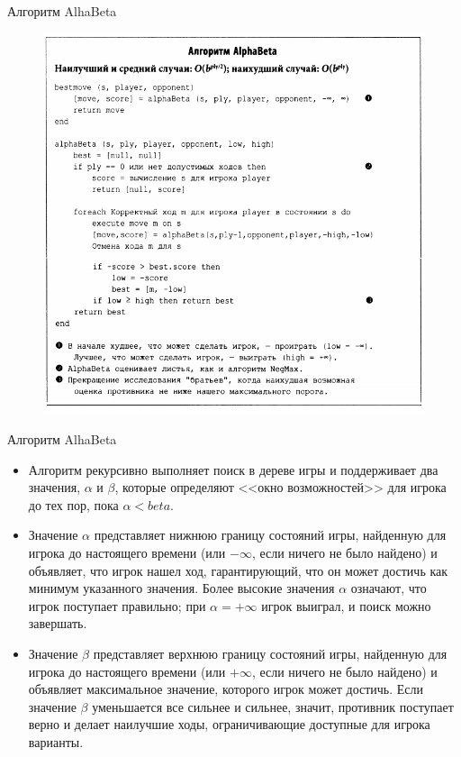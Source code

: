 \documentclass{beamer}
\begin{document}
\begin{frame}{Алгоритм AlhaBeta}
\begin{figure}[h]
\centering
\includegraphics[scale=0.4]{images/lec05-pic10.png}
\end{figure}
\end{frame}

\begin{frame}{Алгоритм AlhaBeta}
\begin{itemize}
\item Алгоритм рекурсивно выполняет поиск в дереве игры и поддерживает
два значения, $\alpha$ и $\beta$, которые определяют <<окно возможностей>> для игрока до тех пор, пока $\alpha < beta$. 
\item Значение $\alpha$ представляет нижнюю границу состояний игры, найденную для игрока до настоящего времени (или $-\infty$, если ничего не было найдено)
и объявляет, что игрок нашел ход, гарантирующий, что он может достичь как минимум указанного значения. Более высокие значения $\alpha$ означают, что игрок поступает правильно; при $\alpha = +\infty$ игрок выиграл, и поиск можно завершать.
\item Значение $\beta$ представляет верхнюю границу состояний игры, найденную для игрока до настоящего времени (или $+\infty$, если ничего не было найдено) и объявляет максимальное значение, которого игрок может достичь. Если значение $\beta$ уменьшается все сильнее и сильнее, значит, противник поступает верно и делает наилучшие ходы, ограничивающие доступные для игрока варианты. 
\end{itemize}
\end{frame}
\end{document}
